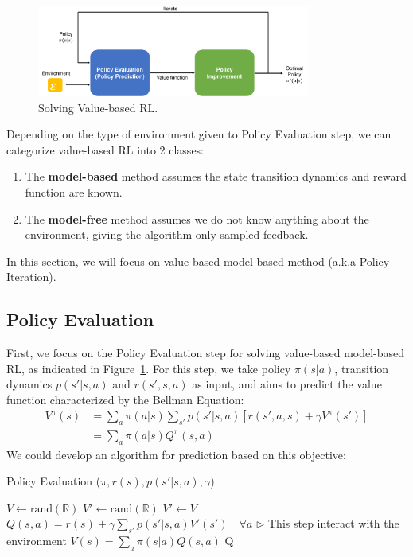 \documentclass[11pt]{article}
\begin{document}
\begin{figure}[h]
    \centering
    \includegraphics[width=0.8\textwidth]{Img/policy-iteration.pdf}
    \caption{Solving Value-based RL.}
    \label{fig:value-control}
\end{figure}

Depending on the type of environment given to Policy Evaluation step, we can categorize value-based RL into 2 classes:
\begin{enumerate} \itemsep -2pt
    \item The \textbf{model-based} method assumes the state transition dynamics and reward function are known.
    \item The \textbf{model-free} method assumes we do not know anything about the environment, giving the algorithm only sampled feedback. 
\end{enumerate}
 In this section, we will focus on value-based model-based method (a.k.a Policy Iteration).


\subsection{Policy Evaluation}

First, we focus on the Policy Evaluation step for solving value-based model-based RL, as indicated in Figure~\ref{fig:value-control}. For this step, we take policy $\pi(s|a)$, transition dynamics $p(s'|s, a)$ and $r(s', s, a)$ as input, and aims to predict the value function characterized by the Bellman Equation:
%
\begin{align}
V^\pi(s) &= \sum_a \pi(a|s) \sum_{s'} p(s'|s, a)[r(s', a, s) + \gamma V^\pi(s')] \\
&= \sum_a \pi(a|s) Q^\pi (s, a) \label{eq:value_function}
\end{align}
%
We could develop an algorithm for prediction based on this objective:
%
\begin{algorithm}[H]
\caption{Policy Evaluation ($\pi, r(s), p(s'|s, a), \gamma$)}
\label{algo:policy_evaluation}
\begin{algorithmic}[1]
\STATE $V \leftarrow \text{rand}(\mathbb{R})$
\STATE $V' \leftarrow \text{rand}(\mathbb{R})$
\STATE $V' \leftarrow V$
\STATE $Q(s, a) = r(s) + \gamma \sum_{s'} p(s'|s, a) V'(s') \quad \forall a$ \hfill $\triangleright$ This step interact with the environment
\STATE $V(s) = \sum_a \pi(s|a)Q(s, a)$
\ENDFOR
\ENDWHILE
\RETURN Q
\end{algorithmic}
\end{algorithm}
\end{document}
